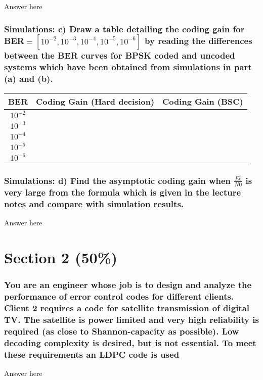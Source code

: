 \documentclass[a4paper]{report}
\begin{document}
Answer here \\

\subsubsection*{Simulations: c) Draw a table detailing the coding gain for BER$= [10^{−2}, 10^{−3}, 10^{−4} , 10^{−5} , 10^{−6} ]$ by reading the differences between the BER curves for BPSK coded and uncoded systems which have been obtained from simulations in part (a) and (b).}

\begin{tabular}{| c | c | c |}
\hline
BER & Coding Gain (Hard decision) & Coding Gain (BSC) \\
\hline
$10^{-2}$ & & \\
\hline
$10^{-3}$ & & \\
\hline
$10^{-4}$ & & \\
\hline
$10^{-5}$ & & \\
\hline
$10^{-6}$ & & \\
\hline
\end{tabular}

\subsubsection*{Simulations: d) Find the asymptotic coding gain when $\frac{Eb}{N0}$ is very large from the formula which is given in the lecture notes and compare with simulation results.}

Answer here \\

\section*{Section 2 (50\%)}

\subsubsection*{You are an engineer whose job is to design and analyze the performance of error
control codes for different clients. Client 2 requires a code for satellite transmission of digital TV. The satellite is power limited and very high reliability is required (as close to Shannon-capacity as possible). Low decoding complexity is desired, but is not essential. To meet these requirements an LDPC code is used}

Answer here \\
\end{document}
